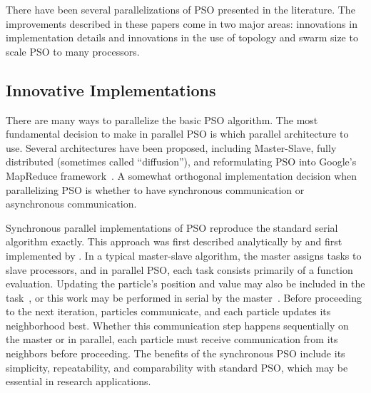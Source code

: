 \documentclass[smallcondensed]{svjour3}
\begin{document}
There have been several parallelizations of PSO presented in the literature.
The improvements described in these papers come in two major areas: innovations
in implementation details and innovations in the use of topology and swarm size
to scale PSO to many processors.

\subsection{Innovative Implementations}

There are many ways to parallelize the basic PSO algorithm.  The most
fundamental decision to make in parallel PSO is which parallel architecture to
use.  Several architectures have been proposed, including Master-Slave, fully
distributed (sometimes called ``diffusion''), and reformulating PSO into
Google's MapReduce framework~\citep{belal-2004-parallel-models-for-pso,
mcnabb-2007-parallel-pso-using-mapreduce}.  A somewhat orthogonal
implementation decision when parallelizing PSO is whether to have synchronous
communication or asynchronous communication.

Synchronous parallel implementations of PSO reproduce the standard serial
algorithm exactly.  This approach was first described analytically by
\citet{belal-2004-parallel-models-for-pso} and first implemented by
\citet{schutte-2004-parallel-global-optimization-with-pso}.  In a typical
master-slave algorithm, the master assigns tasks to slave processors, and in
parallel PSO, each task consists primarily of a function evaluation.  Updating
the particle's position and value may also be included in the
task~\citep{belal-2004-parallel-models-for-pso}, or this work may be performed
in serial by the
master~\citep{schutte-2004-parallel-global-optimization-with-pso}.  Before
proceeding to the next iteration, particles communicate, and each particle
updates its neighborhood best.  Whether this communication step happens
sequentially on the master or in parallel, each particle must receive
communication from its neighbors before proceeding.  The benefits of the
synchronous PSO include its simplicity, repeatability, and comparability with
standard PSO, which may be essential in research applications.
\end{document}
